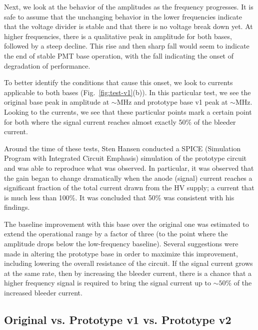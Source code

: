 Next, we look at the behavior of the amplitudes as the frequency progresses. It is safe to assume that the unchanging behavior in the lower frequencies indicate that the voltage divider is stable and that there is no voltage break down yet. At higher frequencies, there is a qualitative peak in amplitude for both bases, followed by a steep decline. This rise and then sharp fall would seem to indicate the end of stable PMT base operation, with the fall indicating the onset of degradation of performance.

To better identify the conditions that cause this onset, we look to currents applicable to both bases (Fig.~\ref{fig:test-v1}(b)). In this particular test, we see the original base peak in amplitude at $\sim$\unit[4]{MHz} and prototype base v1 peak at $\sim$\unit[10]{MHz}. Looking to the currents, we see that these particular points mark a certain point for both where the signal current reaches almost exactly 50\% of the bleeder current. 

Around the time of these tests, Sten Hansen conducted a SPICE (Simulation Program with Integrated Circuit Emphasis) simulation of the prototype circuit and was able to reproduce what was observed. In particular, it was observed that the gain began to change dramatically when the anode (signal) current reaches a significant fraction of the total current drawn from the HV supply; a current that is much less than 100\%. It was concluded that 50\% was consistent with his findings.

The baseline improvement with this base over the original one was estimated to extend the operational range by a factor of three (to the point where the amplitude drops below the low-frequency baseline). Several suggestions were made in altering the prototype base in order to maximize this improvement, including lowering the overall resistance of the circuit. If the signal current grows at the same rate, then by increasing the bleeder current, there is a chance that a higher frequency signal is required to bring the signal current up to $\sim 50\%$ of the increased bleeder current.

\subsection{Original vs. Prototype v1 vs. Prototype v2}

